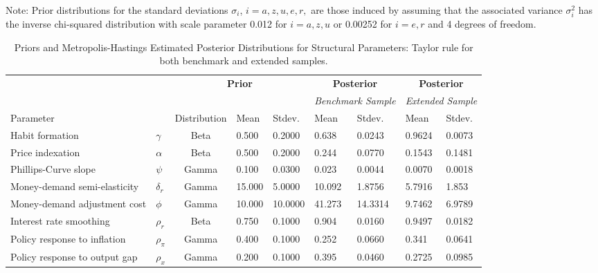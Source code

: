 \documentclass[11pt,preprint, authoryear]{elsarticle}
\numberwithin{equation}{section}
\numberwithin{figure}{section}
\numberwithin{table}{section}
\begin{document}
\begin{small}
\begin{ThreePartTable}
\begin{TableNotes}
      \footnotesize
      \item Note: Prior distributions for the standard deviations $\sigma_i$, $i = a, z, u, e, r,$ are those induced by assuming that the associated variance $\sigma^2_i$ has the inverse chi-squared distribution with scale parameter 0.012 for $i = a, z, u$ or 0.00252 for $i = e, r$ and 4 degrees of freedom.
    \end{TableNotes}
\begin{longtable}{ll|cll|ll|ll|}
\caption{Priors and Metropolis-Hastings Estimated Posterior Distributions for Structural Parameters: Taylor rule for both benchmark and extended samples.}
 \label{priors_posterior}\\
 \toprule
 & & \multicolumn{3}{|c|}{\textbf{Prior}} & \multicolumn{2}{|c|}{\textbf{Posterior}} & \multicolumn{2}{|c|}{\textbf{Posterior}}\\
& & \multicolumn{3}{|c|}{} & \multicolumn{2}{|c|}{\emph{Benchmark Sample}} & \multicolumn{2}{|c|}{\emph{Extended Sample}}\\ 
\hline
 Parameter & & \multicolumn{1}{|l}{Distribution} & Mean  & \multicolumn{1}{l|}{Stdev.} & \multicolumn{1}{|l}{Mean} & \multicolumn{1}{l|}{Stdev.} & \multicolumn{1}{|l}{Mean} & \multicolumn{1}{l|}{Stdev.} \\
  \hline 
  Habit formation & ${\gamma}$ & Beta &   0.500 & 0.2000 &   0.638& 0.0243 & 0.9624 & 0.0073\\ 
  Price indexation & ${\alpha}$ & Beta &   0.500 & 0.2000 &   0.244& 0.0770 & 0.1543 & 0.1481\\ 
  Phillips-Curve slope & ${\psi}$ & Gamma &   0.100 & 0.0300 &   0.023& 0.0044 & 0.0070& 0.0018\\ 
  Money-demand semi-elasticity & ${\delta_r}$ & Gamma &  15.000 & 5.0000 &  10.092& 1.8756 &5.7916 & 1.853\\ 
  Money-demand adjustment cost & ${\phi}$ & Gamma &  10.000 & 10.0000  &  41.273& 14.3314  & 9.7462& 6.9789\\ 
  Interest rate smoothing & ${\rho_r}$ & Beta &   0.750 & 0.1000 &   0.904& 0.0160  & 0.9497 & 0.0182\\ 
  Policy response to inflation & ${\rho_{\pi}}$ & Gamma &   0.400 & 0.1000 &   0.252& 0.0660 & 0.341 & 0.0641\\ 
  Policy response to output gap & ${\rho_x}$ & Gamma &   0.200 & 0.1000 &   0.395& 0.0460 & 0.2725& 0.0985\\ 

\end{longtable}
\end{ThreePartTable}
\end{small}
\end{document}
